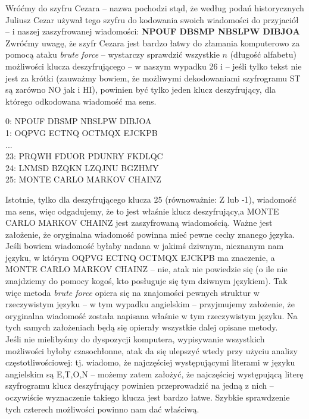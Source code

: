 \documentclass[a4paper]{article}
\theoremstyle{defn}
\theoremstyle{theorem}
\theoremstyle{lemma}
\theoremstyle{cor}
\theoremstyle{fact}
\begin{document}
Wróćmy do szyfru Cezara – nazwa pochodzi stąd, że według podań historycznych Juliusz Cezar używał tego szyfru do kodowania swoich wiadomości do przyjaciół \cite{caesar} – i naszej zaszyfrowanej wiadomości: \textbf{NPOUF DBSMP NBSLPW DIBJOA} Zwróćmy uwagę, że szyfr Cezara jest bardzo łatwy do złamania komputerowo za pomocą ataku \textit{brute force} – wystarczy sprawdzić wszystkie $n$ (długość alfabetu) możliwości klucza deszyfrującego – w naszym wypadku 26 i – jeśli tylko tekst nie jest za krótki (zauważmy bowiem, że możliwymi dekodowaniami szyfrogramu ST są zarówno NO jak i HI), powinien być tylko jeden klucz deszyfrujący, dla którego odkodowana wiadomość ma sens.
\begin{center}
0:  NPOUF DBSMP NBSLPW DIBJOA \\
1:  OQPVG ECTNQ OCTMQX EJCKPB \\
...
\\
23: PRQWH FDUOR PDUNRY FKDLQC \\
24: LNMSD BZQKN LZQJNU BGZHMY \\
25: MONTE CARLO MARKOV CHAINZ \\
\end{center}
Istotnie, tylko dla deszyfrującego klucza 25 (równoważnie: Z lub -1), wiadomość ma sens, więc odgadujemy, że to jest właśnie klucz deszyfrujący,a MONTE CARLO MARKOV CHAINZ jest zaszyfrowaną wiadomością. Ważne jest założenie, że oryginalna wiadomość powinna mieć pewne cechy znanego języka. Jeśli bowiem wiadomość byłaby nadana w jakimś dziwnym, nieznanym nam języku, w którym OQPVG ECTNQ OCTMQX EJCKPB ma znaczenie, a MONTE CARLO MARKOV CHAINZ – nie, atak nie powiedzie się (o ile nie znajdziemy do pomocy kogoś, kto posługuje się tym dziwnym językiem). Tak więc metoda \textit{brute force} opiera się na znajomości pewnych struktur w rzeczywistym języku – w tym wypadku angielskim – przyjmujemy założenie, że oryginalna wiadomość została napisana właśnie w tym rzeczywistym języku. Na tych samych założeniach będą się opierały wszystkie dalej opisane metody.\\
Jeśli nie mielibyśmy do dyspozycji komputera, wypisywanie wszystkich możliwości byłoby czasochłonne, atak da się ulepszyć wtedy przy użyciu analizy częstotliwościowej: tj. wiadomo, że najczęściej występującymi literami w języku angielskim są E,T,O,N – możemy zatem założyć, że najczęściej występującą literę szyfrogramu klucz deszyfrujący powinien przeprowadzić na jedną z nich – oczywiście wyznaczenie takiego klucza jest bardzo łatwe. Szybkie sprawdzenie tych czterech możliwości powinno nam dać właściwą.
\\
\end{document}
